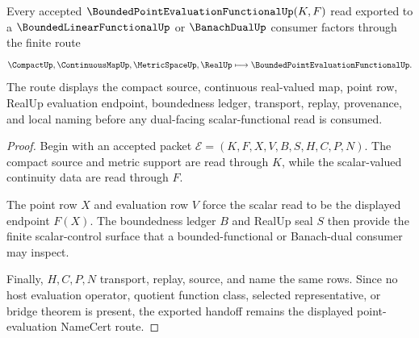 \begin{theorem}
\label{thm:bounded-point-evaluation-dual-handoff}
Every accepted $\BoundedPointEvaluationFunctionalUp(K,F)$ read exported to a $\BoundedLinearFunctionalUp$ or $\BanachDualUp$ consumer factors through the finite route
$$
\CompactUp,\ContinuousMapUp,\MetricSpaceUp,\RealUp
\longmapsto
\BoundedPointEvaluationFunctionalUp .
$$
The route displays the compact source, continuous real-valued map, point row, RealUp evaluation endpoint, boundedness ledger, transport, replay, provenance, and local naming before any dual-facing scalar-functional read is consumed.
\end{theorem}
\begin{proof}
Begin with an accepted packet $\mathcal{E}=(K,F,X,V,B,S,H,C,P,N)$. The compact source and metric support are read through $K$, while the scalar-valued continuity data are read through $F$.

The point row $X$ and evaluation row $V$ force the scalar read to be the displayed endpoint $F(X)$. The boundedness ledger $B$ and RealUp seal $S$ then provide the finite scalar-control surface that a bounded-functional or Banach-dual consumer may inspect.

Finally, $H,C,P,N$ transport, replay, source, and name the same rows. Since no host evaluation operator, quotient function class, selected representative, or bridge theorem is present, the exported handoff remains the displayed point-evaluation NameCert route.
\end{proof}




